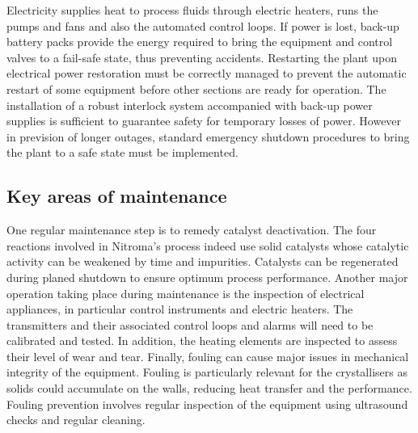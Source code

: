 Electricity supplies heat to process fluids through electric heaters, runs the pumps and fans and also the automated control loops. If power is lost, back-up battery packs provide the energy required to bring the equipment and control valves to a fail-safe state, thus preventing accidents. Restarting the plant upon electrical power restoration must be correctly managed to prevent the automatic restart of some equipment before other sections are ready for operation. The installation of a robust interlock system accompanied with back-up power supplies is sufficient to guarantee safety for temporary losses of power. However in prevision of longer outages, standard emergency shutdown procedures to bring the plant to a safe state must be implemented.


\subsection{Key areas of maintenance} %
One regular maintenance step is to remedy catalyst deactivation. The four reactions involved in Nitroma's process indeed use solid catalysts whose catalytic activity can be weakened by time and impurities. Catalysts can be regenerated during planed shutdown to ensure optimum process performance. Another major operation taking place during maintenance is the inspection of electrical appliances, in particular control instruments and electric heaters. The transmitters and their associated control loops and alarms will need to be calibrated and tested. In addition, the heating elements are inspected to assess their level of wear and tear. Finally, fouling can cause major issues in mechanical integrity of the equipment. Fouling is particularly relevant for the crystallisers as solids could accumulate on the walls, reducing heat transfer and the performance. Fouling prevention involves regular inspection of the equipment using ultrasound checks and regular cleaning.